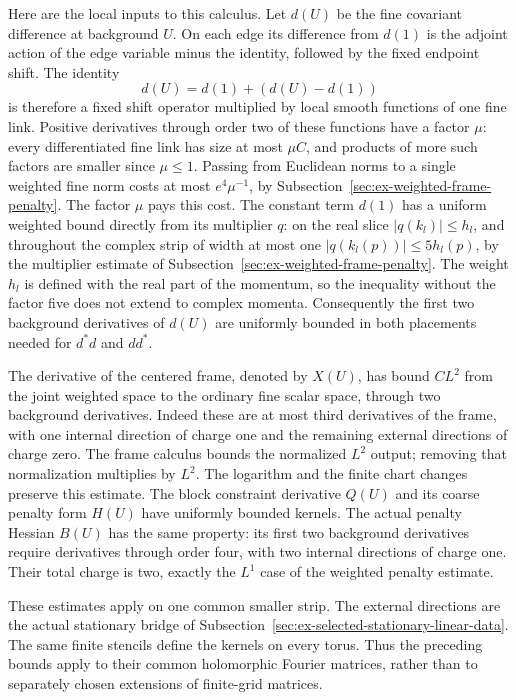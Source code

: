 Here are the local inputs to this calculus. Let $d(U)$ be the fine
covariant difference at background $U$. On each edge its difference
from $d(1)$ is the adjoint action of the edge variable minus the
identity, followed by the fixed endpoint shift. The identity
\[
 d(U)=d(1)+(d(U)-d(1))
\]
is therefore a fixed shift operator multiplied by local smooth
functions of one fine link. Positive derivatives through order two
of these functions have a factor $\mu$: every differentiated fine
link has size at most $\mu C$, and products of more such factors
are smaller since $\mu\leq1$. Passing from Euclidean norms to a
single weighted fine norm costs at most $e^4\mu^{-1}$, by
Subsection~\ref{sec:ex-weighted-frame-penalty}. The factor $\mu$ pays
this cost. The constant term $d(1)$ has a uniform weighted bound
directly from its multiplier $q$: on the real slice
$|q(k_l)|\leq h_l$, and throughout the complex strip of width at
most one $|q(k_l(p))|\leq5h_l(p)$, by the multiplier estimate of
Subsection~\ref{sec:ex-weighted-frame-penalty}. The weight $h_l$ is
defined with the real part of the momentum, so the inequality without
the factor five does not extend to complex momenta. Consequently
the first two background derivatives of $d(U)$ are uniformly bounded
in both placements needed for $d^*d$ and $dd^*$.

The derivative of the centered frame, denoted by $X(U)$, has bound
$C L^2$ from the joint weighted space to the ordinary fine scalar
space, through two background derivatives. Indeed these are at most
third derivatives of the frame, with one internal direction of charge
one and the remaining external directions of charge zero. The frame
calculus bounds the normalized $L^2$ output; removing that
normalization multiplies by $L^2$. The logarithm and the finite chart
changes preserve this estimate. The block constraint derivative $Q(U)$
and its coarse penalty form $H(U)$ have uniformly bounded kernels.
The actual penalty Hessian $B(U)$ has the same property: its first
two background derivatives require derivatives through order four,
with two internal directions of charge one. Their total charge is
two, exactly the $L^1$ case of the weighted penalty estimate.

These estimates apply on one common smaller strip. The external
directions are the actual stationary bridge of
Subsection~\ref{sec:ex-selected-stationary-linear-data}. The same finite
stencils define the kernels on every torus. Thus the preceding
bounds apply to their common holomorphic Fourier matrices, rather
than to separately chosen extensions of finite-grid matrices.


